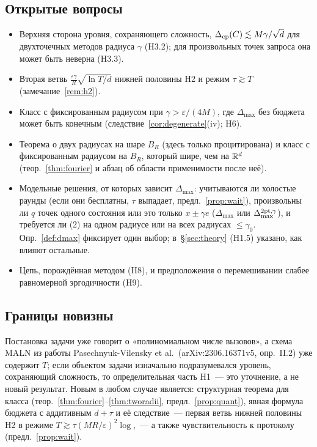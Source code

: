 \documentclass[11pt,a4paper]{article}
\numberwithin{equation}{section}
\theoremstyle{definition}
\theoremstyle{remark}
\newcommand{\Dmax}{\Delta_{\max}}\newcommand{\Dcp}{\Delta_{\rm cp}}
\begin{document}
\subsection{Открытые вопросы}
\begin{itemize}
\item Верхняя сторона уровня, сохраняющего сложность, $\Dcp(C)\lesssim M\gamma/\sqrt d$ для двухточечных методов радиуса $\gamma$ (H3.2); для произвольных точек запроса она может быть неверна (H3.3).
\item Вторая ветвь $\frac{\varepsilon\gamma}R\sqrt{\ln T/d}$ нижней половины H2 и режим $\tau\gtrsim T$ (замечание~\ref{rem:h2}).
\item Класс с фиксированным радиусом при $\gamma>\varepsilon/(4M)$, где $\Dmax$ без бюджета может быть конечным (следствие~\ref{cor:degenerate}(iv); H6).
\item Теорема о двух радиусах на шаре $B_R$ (здесь только процитирована) и класс с фиксированным радиусом на $B_R$, который шире, чем на $\mathbb R^d$ (теор.~\ref{thm:fourier} и абзац об области применимости после неё).
\item Модельные решения, от которых зависит $\Dmax$: учитываются ли холостые раунды (если они бесплатны, $\tau$ выпадает, предл.~\ref{prop:wait}), произвольны ли $q$ точек одного состояния или это только $x\pm\gamma e$ ($\Dmax$ или $\Dmax^{2\rm pt,\gamma}$), и требуется ли (2) на одном радиусе или на всех радиусах $\le\gamma_0$. Опр.~\ref{def:dmax} фиксирует один выбор; в~\S\ref{sec:theory} (H1.5) указано, как влияют остальные.
\item Цепь, порождённая методом (H8), и предположения о перемешивании слабее равномерной эргодичности (H9).
\end{itemize}

\subsection{Границы новизны}
Постановка задачи уже говорит о «полиномиальном числе вызовов», а схема MALN из работы Pasechnyuk-Vilensky et al.\ (arXiv:2306.16371v5, опр.~II.2) уже содержит $T$; если объектом задачи изначально подразумевался уровень, сохраняющий сложность, то определительная часть H1~--- это уточнение, а не новый результат. Новым в любом случае является: структурная теорема для класса (теор.~\ref{thm:fourier}--\ref{thm:tworadii}, предл.~\ref{prop:quant}), явная формула бюджета с аддитивным $d+\tau$ и её следствие~--- первая ветвь нижней половины H2 в режиме $T\gtrsim\tau(MR/\varepsilon)^2\log$,~--- а также чувствительность к протоколу (предл.~\ref{prop:wait}).
\end{document}
